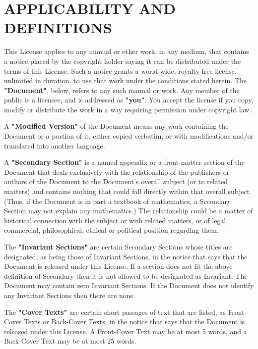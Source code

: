 \documentclass[oneside]{stacks-project-book}
\theoremstyle{plain}
\theoremstyle{definition}
\theoremstyle{remark}
\numberwithin{equation}{subsection}
\begin{document}
\section{APPLICABILITY AND DEFINITIONS}
\label{fdl-section-applicability-and-definitions}
\hypertarget{05BG}{}
\reversemarginpar{}

This License applies to any manual or other work, in any medium, that
contains a notice placed by the copyright holder saying it can be
distributed under the terms of this License.  Such a notice grants a
world-wide, royalty-free license, unlimited in duration, to use that
work under the conditions stated herein.  The \textbf{"Document"}, below,
refers to any such manual or work.  Any member of the public is a
licensee, and is addressed as \textbf{"you"}.  You accept the license if you
copy, modify or distribute the work in a way requiring permission
under copyright law.

A \textbf{"Modified Version"} of the Document means any work containing the
Document or a portion of it, either copied verbatim, or with
modifications and/or translated into another language.

A \textbf{"Secondary Section"} is a named appendix or a front-matter section of
the Document that deals exclusively with the relationship of the
publishers or authors of the Document to the Document's overall subject
(or to related matters) and contains nothing that could fall directly
within that overall subject.  (Thus, if the Document is in part a
textbook of mathematics, a Secondary Section may not explain any
mathematics.)  The relationship could be a matter of historical
connection with the subject or with related matters, or of legal,
commercial, philosophical, ethical or political position regarding
them.

The \textbf{"Invariant Sections"} are certain Secondary Sections whose titles
are designated, as being those of Invariant Sections, in the notice
that says that the Document is released under this License.  If a
section does not fit the above definition of Secondary then it is not
allowed to be designated as Invariant.  The Document may contain zero
Invariant Sections.  If the Document does not identify any Invariant
Sections then there are none.

The \textbf{"Cover Texts"} are certain short passages of text that are listed,
as Front-Cover Texts or Back-Cover Texts, in the notice that says that
the Document is released under this License.  A Front-Cover Text may
be at most 5 words, and a Back-Cover Text may be at most 25 words.
\end{document}
